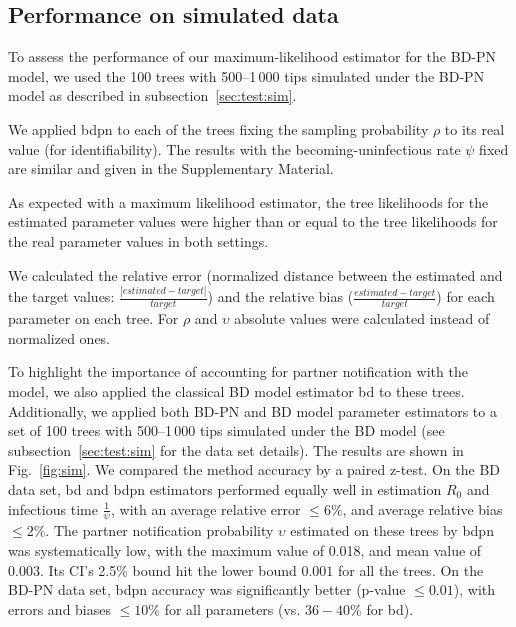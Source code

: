\documentclass[a4paper,10pt]{article}
\begin{document}
\subsection{Performance on simulated data}

To assess the performance of our maximum-likelihood estimator for the BD-PN model, we used the 100 trees with 500--1\,000 tips simulated under the BD-PN model as described in subsection~\ref{sec:test:sim}.

We applied bdpn to each of the trees fixing the sampling probability $\rho$ to its real value (for identifiability). The results with the becoming-uninfectious rate $\psi$ fixed are similar and given in the Supplementary Material.

As expected with a maximum likelihood estimator, the tree likelihoods for the estimated parameter values were higher than or equal to the tree likelihoods for the real parameter values in both settings.



We calculated the relative error (normalized distance between the estimated and the target values: $\frac{|estimated - target|}{target}$) and the relative bias ($\frac{estimated - target}{target}$) for each parameter on each tree. For $\rho$ and $\upsilon$ absolute values were calculated instead of normalized ones. 

To highlight the importance of accounting for partner notification with the model, we also applied the classical BD model estimator bd to these trees. Additionally, we applied both BD-PN and BD model parameter estimators to a set of 100 trees with 500--1\,000 tips simulated under the BD model (see subsection~\ref{sec:test:sim} for the data set details). The results are shown in  Fig.~\ref{fig:sim}. We compared the method accuracy by a paired z-test. On the BD data set, bd and bdpn estimators performed equally well in estimation $R_0$ and infectious time $\frac{1}{\psi}$, with an average relative error $\leq 6\%$, and average relative bias $\leq 2\%$. The partner notification probability $\upsilon$ estimated on these trees by bdpn was systematically low, with the maximum value of 0.018, and mean value of 0.003. Its CI's 2.5\% bound hit the lower bound $0.001$ for all the trees. On the BD-PN data set, bdpn accuracy was significantly better (p-value $\leq 0.01$), with errors and biases $\leq 10\%$ for all parameters (vs. $36-40\%$ for bd).


\end{document}
